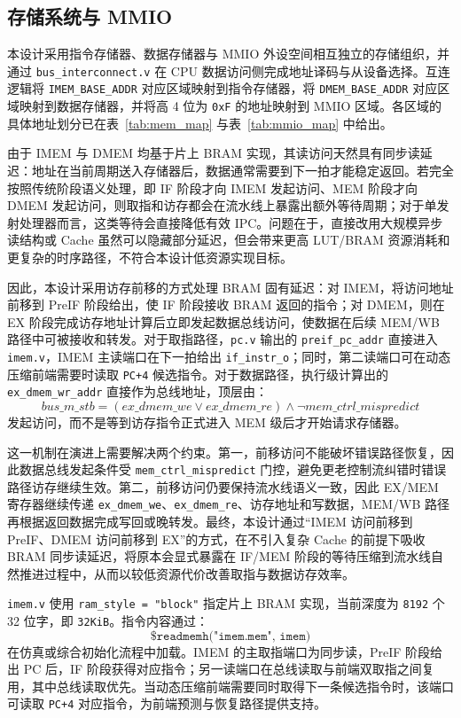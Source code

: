﻿\documentclass[12pt,a4paper]{ctexart}
\begin{document}
\subsection{存储系统与 MMIO}
    本设计采用指令存储器、数据存储器与 MMIO 外设空间相互独立的存储组织，并通过 \texttt{bus\_interconnect.v} 在 CPU 数据访问侧完成地址译码与从设备选择。互连逻辑将 \texttt{IMEM\_BASE\_ADDR} 对应区域映射到指令存储器，将 \texttt{DMEM\_BASE\_ADDR} 对应区域映射到数据存储器，并将高 4 位为 \texttt{0xF} 的地址映射到 MMIO 区域。各区域的具体地址划分已在表~\ref{tab:mem_map} 与表~\ref{tab:mmio_map} 中给出。

    由于 IMEM 与 DMEM 均基于片上 BRAM 实现，其读访问天然具有同步读延迟：地址在当前周期送入存储器后，数据通常需要到下一拍才能稳定返回。若完全按照传统阶段语义处理，即 IF 阶段才向 IMEM 发起访问、MEM 阶段才向 DMEM 发起访问，则取指和访存都会在流水线上暴露出额外等待周期；对于单发射处理器而言，这类等待会直接降低有效 IPC。问题在于，直接改用大规模异步读结构或 Cache 虽然可以隐藏部分延迟，但会带来更高 LUT/BRAM 资源消耗和更复杂的时序路径，不符合本设计低资源实现目标。

    因此，本设计采用访存前移的方式处理 BRAM 固有延迟：对 IMEM，将访问地址前移到 PreIF 阶段给出，使 IF 阶段接收 BRAM 返回的指令；对 DMEM，则在 EX 阶段完成访存地址计算后立即发起数据总线访问，使数据在后续 MEM/WB 路径中可被接收和转发。对于取指路径，\texttt{pc.v} 输出的 \texttt{preif\_pc\_addr} 直接进入 \texttt{imem.v}，IMEM 主读端口在下一拍给出 \texttt{if\_instr\_o}；同时，第二读端口可在动态压缩前端需要时读取 \texttt{PC+4} 候选指令。对于数据路径，执行级计算出的 \texttt{ex\_dmem\_wr\_addr} 直接作为总线地址，顶层由：
    \[
        bus\_m\_stb = (ex\_dmem\_we \lor ex\_dmem\_re) \land \lnot mem\_ctrl\_mispredict
    \]
    发起访问，而不是等到访存指令正式进入 MEM 级后才开始请求存储器。

    这一机制在演进上需要解决两个约束。第一，前移访问不能破坏错误路径恢复，因此数据总线发起条件受 \texttt{mem\_ctrl\_mispredict} 门控，避免更老控制流纠错时错误路径访存继续生效。第二，前移访问仍要保持流水线语义一致，因此 EX/MEM 寄存器继续传递 \texttt{ex\_dmem\_we}、\texttt{ex\_dmem\_re}、访存地址和写数据，MEM/WB 路径再根据返回数据完成写回或晚转发。最终，本设计通过“IMEM 访问前移到 PreIF、DMEM 访问前移到 EX”的方式，在不引入复杂 Cache 的前提下吸收 BRAM 同步读延迟，将原本会显式暴露在 IF/MEM 阶段的等待压缩到流水线自然推进过程中，从而以较低资源代价改善取指与数据访存效率。

    \texttt{imem.v} 使用 \texttt{ram\_style = "block"} 指定片上 BRAM 实现，当前深度为 \texttt{8192} 个 32 位字，即 \texttt{32KiB}。指令内容通过：
    \[
        \texttt{\$readmemh("imem.mem", imem)}
    \]
    在仿真或综合初始化流程中加载。IMEM 的主取指端口为同步读，PreIF 阶段给出 PC 后，IF 阶段获得对应指令；另一读端口在总线读取与前端双取指之间复用，其中总线读取优先。当动态压缩前端需要同时取得下一条候选指令时，该端口可读取 \texttt{PC+4} 对应指令，为前端预测与恢复路径提供支持。
\end{document}
